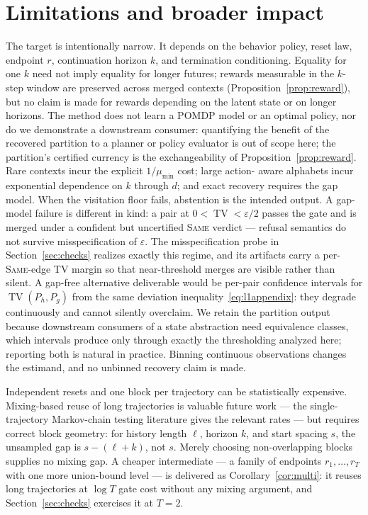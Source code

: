 \documentclass{article}
\newcommand{\eps}{\varepsilon}
\DeclareMathOperator{\TV}{TV}
\begin{document}
\section{Limitations and broader impact}

The target is intentionally narrow.  It depends on the behavior policy,
reset law, endpoint $r$, continuation horizon $k$, and termination
conditioning.  Equality for one $k$ need not imply equality for longer
futures; rewards measurable in the $k$-step window are preserved across
merged contexts (Proposition~\ref{prop:reward}), but no claim is made for
rewards depending on the latent state or on longer horizons.  The method
does not learn a POMDP model or an optimal policy, nor do we demonstrate a
downstream consumer: quantifying the benefit of the recovered partition to
a planner or policy evaluator is out of scope here; the partition's
certified currency is the exchangeability of
Proposition~\ref{prop:reward}.  Rare contexts incur the explicit $1/\mu_{\min}$ cost; large action-
aware alphabets incur exponential dependence on $k$ through $d$; and exact
recovery requires the gap model.  When the visitation floor fails,
abstention is the intended output.  A gap-model failure is different in
kind: a pair at $0<\TV<\eps/2$ passes the gate and is merged under a
confident but uncertified \textsc{Same} verdict --- refusal semantics do
not survive misspecification of $\eps$.  The misspecification probe in
Section~\ref{sec:checks} realizes exactly this regime, and its artifacts
carry a per-\textsc{Same}-edge TV margin so that near-threshold merges are
visible rather than silent.  A gap-free alternative deliverable would be
per-pair confidence intervals for $\TV(P_h,P_g)$ from the same deviation
inequality~\eqref{eq:l1appendix}: they degrade continuously and cannot
silently overclaim.  We retain the partition output because downstream
consumers of a state abstraction need equivalence classes, which intervals
produce only through exactly the thresholding analyzed here; reporting both
is natural in practice.  Binning continuous observations changes the
estimand, and no unbinned recovery claim is made.

Independent resets and one block per trajectory can be statistically
expensive.  Mixing-based reuse of long trajectories is valuable future work
--- the single-trajectory Markov-chain testing literature gives the relevant
rates \citep{daskalakis2018testing,wolfer2019minimax} --- but requires
correct block geometry: for history length $\ell$, horizon $k$,
and start spacing $s$, the unsampled gap is $s-(\ell+k)$, not $s$.  Merely
choosing non-overlapping blocks supplies no mixing gap.  A cheaper
intermediate --- a family of endpoints $r_1,\ldots,r_T$ with one more
union-bound level --- is delivered as Corollary~\ref{cor:multi}: it reuses
long trajectories at $\log T$ gate cost without any mixing argument, and
Section~\ref{sec:checks} exercises it at $T=2$.
\end{document}
